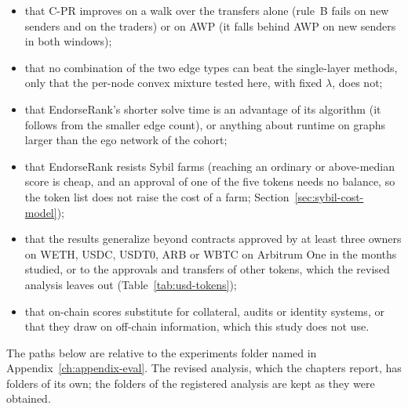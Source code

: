 \begin{itemize}
\item that C-PR improves on a walk over the transfers alone (rule~B fails on new senders and on the traders) or on AWP (it falls behind AWP on new senders in both windows);
\item that no combination of the two edge types can beat the single-layer methods, only that the per-node convex mixture tested here, with fixed $\lambda$, does not;
\item that EndorseRank's shorter solve time is an advantage of its algorithm (it follows from the smaller edge count), or anything about runtime on graphs larger than the ego network of the cohort;
\item that EndorseRank resists Sybil farms (reaching an ordinary or above-median score is cheap, and an approval of one of the five tokens needs no balance, so the token list does not raise the cost of a farm; Section~\ref{sec:sybil-cost-model});
\item that the results generalize beyond contracts approved by at least three owners on WETH, USDC, USDT0, ARB or WBTC on Arbitrum One in the months studied, or to the approvals and transfers of other tokens, which the revised analysis leaves out (Table~\ref{tab:usd-tokens});
\item that on-chain scores substitute for collateral, audits or identity systems, or that they draw on off-chain information, which this study does not use.
\end{itemize}


The paths below are relative to the experiments folder named in Appendix~\ref{ch:appendix-eval}. The revised analysis, which the chapters report, has folders of its own; the folders of the registered analysis are kept as they were obtained.

